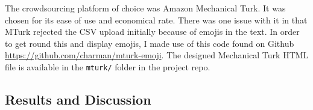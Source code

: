 \documentclass{mproj}
\begin{document}

The crowdsourcing platform of choice was Amazon Mechanical Turk. It was chosen for its ease of use and economical rate. There was one issue with it in that MTurk rejected the CSV upload initially because of emojis in the text. In order to get round this and display emojis, I made use of this code found on Github \url{https://github.com/charman/mturk-emoji}. The designed Mechanical Turk HTML file is available in the \lstinline{mturk/} folder in the project repo.


\subsection{Results and Discussion}


%
%
\end{document}
